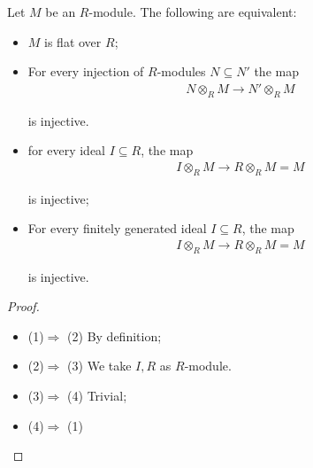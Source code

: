 \documentclass[Total.tex]{subfiles}
\begin{document}
				\begin{lemma}
					Let $M$ be an $R$-module. The following are equivalent:
					\begin{itemize}
						\item $M$ is flat over $R$;
						\item For every injection of $R$-modules $N\subseteq N'$ the map
						\begin{gather*}
							N\otimes_R M\rightarrow N'\otimes_R M
						\end{gather*}
						
						is injective.
						\item for every ideal $I\subseteq R$, the map
						\begin{gather*}
							I\otimes_R M\rightarrow R\otimes_R M=M
						\end{gather*}
						
						is injective;
						\item For every finitely generated ideal $I\subseteq R$, the map
						\begin{gather*}
							I\otimes_R M\rightarrow R\otimes_R M=M
						\end{gather*}
						
						is injective.
					\end{itemize}
				\end{lemma}
				\begin{proof}
					\begin{itemize}
						\item (1)$\Rightarrow$ (2) By definition;
						\item (2)$\Rightarrow$ (3) We take $I,R$ as $R$-module.
						\item (3)$\Rightarrow$ (4) Trivial;
						\item (4)$\Rightarrow$ (1) 
					\end{itemize}
				\end{proof}
				
\end{document}
